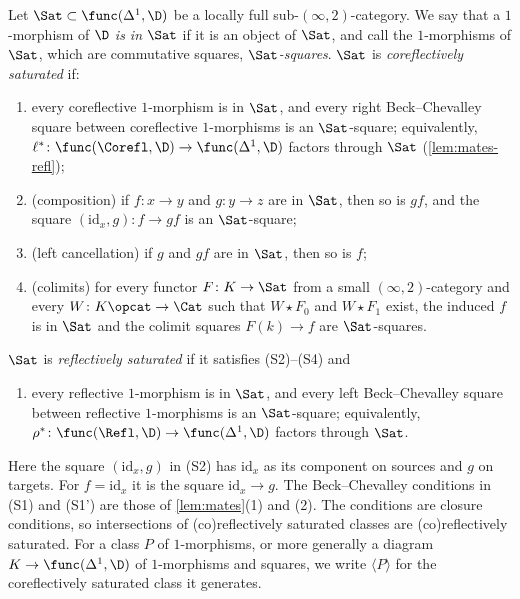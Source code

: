 \begin{defi}
\label{def:saturated}
Let $\Sat \subset \func(\Delta^{1},\D)$ be a locally full sub-$(\infty,2)$-category. We say that a $1$-morphism of $\D$ \emph{is in $\Sat$} if it is an object of $\Sat$, and call the $1$-morphisms of $\Sat$, which are commutative squares, \emph{$\Sat$-squares}. $\Sat$ is \emph{coreflectively saturated} if:
\begin{enumerate}
\item[(S1)] every coreflective $1$-morphism is in $\Sat$, and every right Beck--Chevalley square between coreflective $1$-morphisms is an $\Sat$-square; equivalently, $\ell^{*}\colon \func(\Corefl,\D) \to \func(\Delta^{1},\D)$ factors through $\Sat$ (\cref{lem:mates-refl});
\item[(S2)] (composition) if $f\colon x \to y$ and $g\colon y \to z$ are in $\Sat$, then so is $gf$, and the square $(\mathrm{id}_{x},g)\colon f \to gf$ is an $\Sat$-square;
\item[(S3)] (left cancellation) if $g$ and $gf$ are in $\Sat$, then so is $f$;
\item[(S4)] (colimits) for every functor $F\colon K \to \Sat$ from a small $(\infty,2)$-category and every $W\colon K\opcat \to \Cat$ such that $W \star F_{0}$ and $W \star F_{1}$ exist, the induced $f$ is in $\Sat$ and the colimit squares $F(k) \to f$ are $\Sat$-squares.
\end{enumerate}
$\Sat$ is \emph{reflectively saturated} if it satisfies (S2)--(S4) and
\begin{enumerate}
\item[(S1')] every reflective $1$-morphism is in $\Sat$, and every left Beck--Chevalley square between reflective $1$-morphisms is an $\Sat$-square; equivalently, $\rho^{*}\colon \func(\Refl,\D) \to \func(\Delta^{1},\D)$ factors through $\Sat$.
\end{enumerate}
\end{defi}

Here the square $(\mathrm{id}_{x},g)$ in (S2) has $\mathrm{id}_{x}$ as its component on sources and $g$ on targets. For $f = \mathrm{id}_{x}$ it is the square $\mathrm{id}_{x} \to g$. The Beck--Chevalley conditions in (S1) and (S1') are those of \cref{lem:mates}(1) and (2).
The conditions are closure conditions, so intersections of (co)reflectively saturated classes are (co)reflectively saturated. For a class $P$ of $1$-morphisms, or more generally a diagram $K \to \func(\Delta^{1},\D)$ of $1$-morphisms and squares, we write $\langle P \rangle$ for the coreflectively saturated class it generates.

